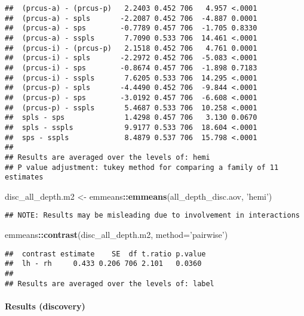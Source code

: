 \documentclass[
]{article}
\newenvironment{Shaded}{\begin{snugshade}}{\end{snugshade}}
\newcommand{\DataTypeTok}[1]{\textcolor[rgb]{0.13,0.29,0.53}{#1}}
\newcommand{\KeywordTok}[1]{\textcolor[rgb]{0.13,0.29,0.53}{\textbf{#1}}}
\newcommand{\NormalTok}[1]{#1}
\newcommand{\OperatorTok}[1]{\textcolor[rgb]{0.81,0.36,0.00}{\textbf{#1}}}
\newcommand{\StringTok}[1]{\textcolor[rgb]{0.31,0.60,0.02}{#1}}
\begin{document}
\begin{verbatim}
##  (prcus-a) - (prcus-p)   2.2403 0.452 706   4.957 <.0001 
##  (prcus-a) - spls       -2.2087 0.452 706  -4.887 0.0001 
##  (prcus-a) - sps        -0.7789 0.457 706  -1.705 0.8330 
##  (prcus-a) - sspls       7.7090 0.533 706  14.461 <.0001 
##  (prcus-i) - (prcus-p)   2.1518 0.452 706   4.761 0.0001 
##  (prcus-i) - spls       -2.2972 0.452 706  -5.083 <.0001 
##  (prcus-i) - sps        -0.8674 0.457 706  -1.898 0.7183 
##  (prcus-i) - sspls       7.6205 0.533 706  14.295 <.0001 
##  (prcus-p) - spls       -4.4490 0.452 706  -9.844 <.0001 
##  (prcus-p) - sps        -3.0192 0.457 706  -6.608 <.0001 
##  (prcus-p) - sspls       5.4687 0.533 706  10.258 <.0001 
##  spls - sps              1.4298 0.457 706   3.130 0.0670 
##  spls - sspls            9.9177 0.533 706  18.604 <.0001 
##  sps - sspls             8.4879 0.537 706  15.798 <.0001 
## 
## Results are averaged over the levels of: hemi 
## P value adjustment: tukey method for comparing a family of 11 estimates
\end{verbatim}

\begin{Shaded}
\begin{Highlighting}[]
\NormalTok{disc_all_depth.m2 <-}\StringTok{ }\NormalTok{emmeans}\OperatorTok{::}\KeywordTok{emmeans}\NormalTok{(all_depth_disc.aov, }\StringTok{'hemi'}\NormalTok{)}
\end{Highlighting}
\end{Shaded}

\begin{verbatim}
## NOTE: Results may be misleading due to involvement in interactions
\end{verbatim}

\begin{Shaded}
\begin{Highlighting}[]
\NormalTok{emmeans}\OperatorTok{::}\KeywordTok{contrast}\NormalTok{(disc_all_depth.m2, }\DataTypeTok{method=}\StringTok{'pairwise'}\NormalTok{)}
\end{Highlighting}
\end{Shaded}

\begin{verbatim}
##  contrast estimate    SE  df t.ratio p.value
##  lh - rh     0.433 0.206 706 2.101   0.0360 
## 
## Results are averaged over the levels of: label
\end{verbatim}

\hypertarget{results-discovery}{%
\paragraph{Results (discovery)}\label{results-discovery}}
\end{document}
